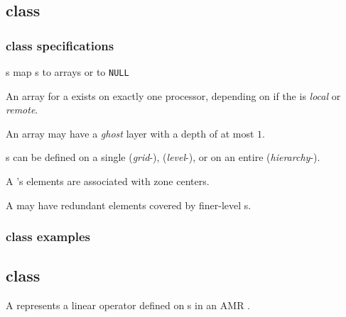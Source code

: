 \documentclass[11pt]{article}
\begin{document}
\subsection{ class} \label{ss:vector}

\subsubsection{ class specifications} \label{sss:vector-specifications}


\BeginENUMERATE
\item {}s map s to arrays or to \texttt{NULL}
\item An array for a  exists on exactly one processor, depending
  on if the  is \textit{local} or \textit{remote}.
\item An array may have a \textit{ghost} layer with a depth of at most $1$.
\item {}s can be defined on a single  (\textit{grid}-),  (\textit{level}-), or on an entire  (\textit{hierarchy}-).
\item A 's elements are associated with zone centers.
\item A  may have redundant elements covered by finer-level s.
\EndENUMERATE

\subsubsection{ class examples} \label{sss:vector-usecases}

\subsection{ class}  \label{ss:matrix}

A  represents a linear operator defined on s in an AMR .

\end{document}
